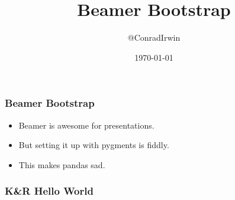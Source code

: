 \documentclass[14pt]{beamer}
\begin{document}
\title{Beamer Bootstrap}
\author{@ConradIrwin}
\date{\today}
\frame{\titlepage}

\frame
{
  \frametitle{Beamer Bootstrap}

  \begin{itemize}
  \item Beamer is awesome for presentations.
  \item But setting it up with pygments is fiddly.
  \item This makes pandas sad.
  \end{itemize}
}

{
\frame{

}
}

\begin{frame}[fragile]
  \frametitle{K\&R Hello World}
  
\end{frame}
\end{document}
